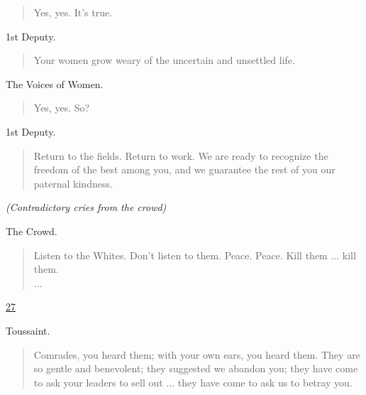 \documentclass[letterpaper,article,12pt,oneside,notitlepage]{memoir}
\begin{document}
\begin{verse}
\hspace{1cm} Yes, yes. It's true. \\
\end{verse}

\begin{center}1st Deputy.\end{center}

\begin{verse}
\hspace{1cm} Your women grow weary of the uncertain and unsettled life. \\
\end{verse}

\begin{center}The Voices of Women.\end{center}

\begin{verse}
\hspace{1cm} Yes, yes. So? \\
\end{verse}

\begin{center}1st Deputy.\end{center}

\begin{verse}
\indent Return to the fields. Return to work. We are ready to recognize the freedom of the best among you, and we guarantee the rest of you our paternal kindness. \\
\end{verse}

\textit{(Contradictory cries from the crowd)}

\begin{center}The Crowd.\end{center}

\begin{verse}
\hspace{1cm} Listen to the Whites. Don't listen to them. Peace. Peace. Kill them ... kill them. \\
... \\
\end{verse}

\clearpage

\href{http://cesaire.elotroalex.com/chiens/chiens/p027.html}{27}

\begin{center}Toussaint.\end{center}

\begin{verse}
\indent Comrades, you heard them; with your own ears, you heard them. They are so gentle and benevolent; they suggested we abandon you; they have come to ask your leaders to sell out ... they have come to ask us to betray you. \\
\end{verse}
\end{document}

